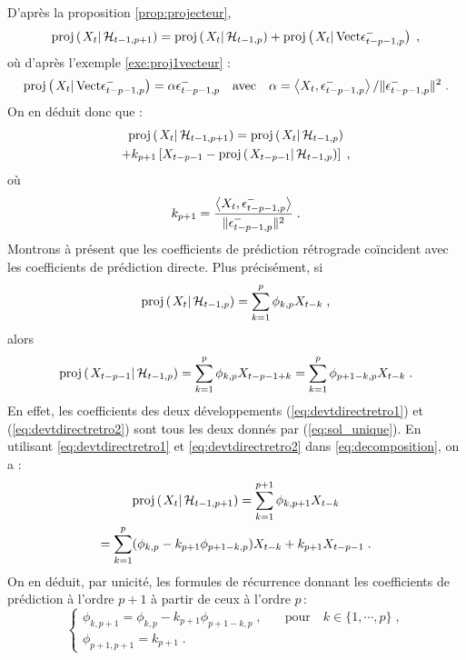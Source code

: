 D'apr\`es la proposition \ref{prop:projecteur},
\begin{multline*}
  \proj{X_t}{\cH_{t-1,p+1}}
  = \proj{X_t}{\cH_{t-1,p}} + \proj{X_t}{\lspan{\epsilon_{t-p-1,p}^-}}\;,
\end{multline*}
o\`u d'apr\`es l'exemple \ref{exe:proj1vecteur} :
$$
\proj{X_t}{\lspan{\epsilon_{t-p-1,p}^-}} = \alpha \epsilon_{t-p-1,p}^-
 \quad \mbox{avec} \quad
 \alpha=\pscal{X_t}{\epsilon_{t-p-1,p}^-}/\|\epsilon_{t-p-1,p}^-\|^2\;.
$$
On en d\'eduit donc que :
\begin{multline}
\label{eq:decomposition}
  \proj{X_t}{\cH_{t-1,p+1}}
  = \proj{X_t}{\cH_{t-1,p}} \\
+ k_{p+1} \left[X_{t-p-1} - \proj{X_{t-p-1}}{\cH_{t-1,p}} \right] \eqsp,
\end{multline}
o\`u
\begin{equation}\label{eq:k_{p+1}}
k_{p+1}=\frac{\pscal{X_t}{\epsilon_{t-p-1,p}^-}}{\|\epsilon_{t-p-1,p}^-\|^2}\;.
\end{equation}
Montrons \`a pr\'esent que les coefficients de pr\'ediction r\'etrograde
co\"{i}ncident avec les coefficients de pr\'ediction directe.
Plus pr\'ecis\'ement, si
\begin{equation}
\label{eq:devtdirectretro1}
 \proj{X_t}{\cH_{t-1,p}} = \sum_{k=1}^{p} \phi_{k,p} X_{t-k}\;,
\end{equation}
alors
\begin{equation}
\label{eq:devtdirectretro2}
 \proj{X_{t-p-1}}{\cH_{t-1,p}} =\sum_{k=1}^{p} \phi_{k,p} X_{t-p-1+k} =\sum_{k=1}^{p} \phi_{p+1-k,p} X_{t-k}\;.
\end{equation}
En effet, les coefficients des deux d\'eveloppements
(\ref{eq:devtdirectretro1}) et (\ref{eq:devtdirectretro2}) sont
tous les deux donn\'es par (\ref{eq:sol_unique}).
En utilisant \eqref{eq:devtdirectretro1} et
\eqref{eq:devtdirectretro2} dans
\eqref{eq:decomposition}, on a :
\begin{multline*}
\proj{X_{t}}{\cH_{t-1,p+1}}
  = \sum_{k=1}^{p+1} \phi_{k,p+1}X_{t-k}\\
  = \sum_{k=1}^{p} (\phi_{k,p} - k_{p+1} \phi_{p+1-k,p} ) X_{t-k} + k_{p+1} X_{t-p-1}\;.
\end{multline*}
On en d\'eduit, par unicit\'e, les formules de r\'ecurrence donnant les coefficients
de pr\'ediction \`a l'ordre $p+1$ \`a partir de ceux \`a
l'ordre $p$\,:
\begin{equation}
 \label{eq:recursionLevinson}
\begin{cases}
\phi_{k,p+1} = \phi_{k,p} - k_{p+1} \phi_{p+1-k,p}\;, & \quad\mbox{pour}\quad k \in \{1, \cdots, p \}\;, \\
\phi_{p+1,p+1} = k_{p+1}\;. &
\end{cases}
\end{equation}
